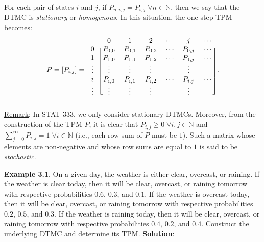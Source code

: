 \begin{Regular}
    For each pair of states $ i $ and $ j $, if $ P_{n,i,j}=P_{i,j}\; \forall n\in\mathbb{N} $,
    then we say that the DTMC is \emph{stationary} or \emph{homogenous}. In this situation, the one-step TPM becomes:
    \[ P=[P_{i,j}]=
        \begin{blockarray}{cccccccc}
            & 0 & 1 & 2 & \cdots & j & \cdots \\
            \begin{block}{c[ccccccc]}
                0 & P_{0,0}  & P_{0,1}  & P_{0,2}  & \cdots & P_{0, j} & \cdots \\
                1 & P_{1,0}  & P_{1,1}  & P_{1,2}  & \cdots & P_{1, j} & \cdots \\
                \vdots & \vdots      & \vdots      & \vdots      &        & \vdots      &        \\
                i & P_{i, 0} & P_{i, 1} & P_{i, 2} & \cdots & P_{i, j} & \cdots \\
                \vdots & \vdots      & \vdots      & \vdots      &        & \vdots      &\\
            \end{block}
        \end{blockarray}. \]
    \tcblower{}
    \underline{Remark}: In STAT 333, we only consider stationary DTMCs. Moreover, from the construction of the TPM $ P $,
    it is clear that $ P_{i,j}\ge 0\; \forall i,j\in\mathbb{N} $ and $ \sum_{j=0}^{\infty} P_{i,j}=1\; \forall i\in\mathbb{N} $
    (i.e., each row sum of $P$ must be $1$). Such a matrix whose elements are non-negative and whose row sums
    are equal to $1$ is said to be \emph{stochastic}.
\end{Regular}
\begin{Example}
    \textbf{Example 3.1}. On a given day, the weather is either clear, overcast, or raining. If the weather
    is clear today, then it will be clear, overcast, or raining tomorrow with respective probabilities
    $0.6$, $0.3$, and $0.1$. If the weather is overcast today, then it will be clear, overcast, or raining
    tomorrow with respective probabilities $0.2$, $0.5$, and $0.3$. If the weather is raining today, then it
    will be clear, overcast, or raining tomorrow with respective probabilities $0.4$, $0.2$, and $0.4$.
    Construct the underlying DTMC and determine its TPM\@.
    \tcblower{}
    \textbf{Solution}:
\end{Example}
